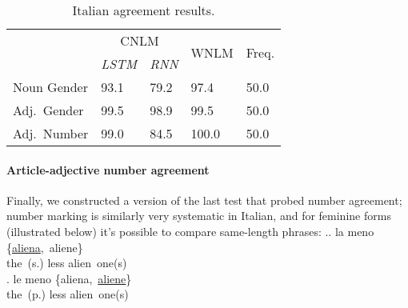 \begin{table}[t]
  \begin{center}
    \begin{tabular}{l|ll|l|l}
	    & \multicolumn{2}{c|}{CNLM} & \multicolumn{1}{c|}{\multirow{2}{*}{WNLM}}  & \multicolumn{1}{c}{\multirow{2}{*}{Freq.}}\\
	    &\emph{LSTM}&\emph{RNN} &  \\ \hline
	    Noun Gender & 93.1  & 79.2 & 97.4 & 50.0\\
	    Adj.~Gender & 99.5 & 98.9 & 99.5 & 50.0\\
	    Adj.~Number & 99.0 & 84.5 & 100.0 & 50.0 \\
%
    \end{tabular}
  \end{center}
	\caption{\label{tab:ital-agr-results} Italian agreement results.} %
\end{table}

\paragraph{Article-adjective number agreement}
Finally, we constructed a version of the last test that probed number agreement; number marking is similarly very systematic in Italian, and for feminine forms (illustrated below) it's possible to compare same-length phrases:
\ex.\ag. la meno \{\underline{aliena},\ aliene\} \\
the\ (s.) less alien\ one(s) \\
\bg. le meno \{aliena,\ \underline{aliene}\} \\
the\ (p.) less alien\ one(s) \\

